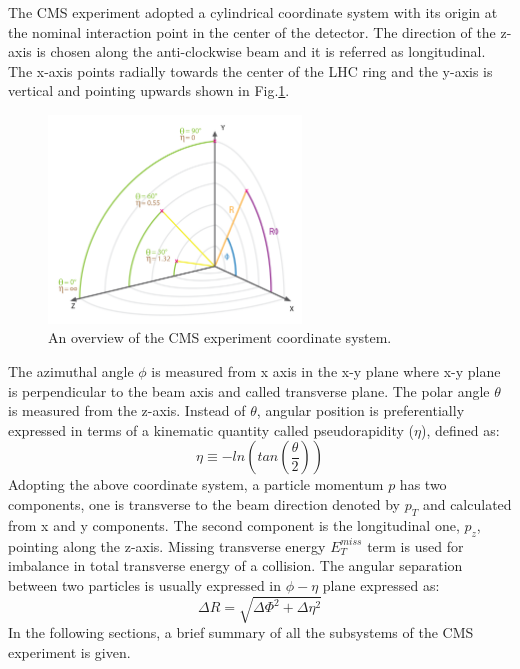The CMS experiment adopted a cylindrical coordinate system with its origin at the nominal interaction point in the center of the detector.    The direction of the z-axis is chosen along the anti-clockwise beam and it is referred as longitudinal. The x-axis points radially towards the center of the LHC ring and the y-axis is vertical and pointing upwards shown in Fig.\ref{fig:CMS_coordinates}. 
\begin{figure}[h!]
\centering
\includegraphics[width=0.6\textwidth]{fig/chapt3/img_cms_coordinates.png}
\caption{\label{fig:CMS_coordinates} An overview of the CMS experiment coordinate system.}
\end{figure}
The azimuthal angle $\phi$ is measured from x axis in the x-y plane where x-y plane is perpendicular to the beam axis and called transverse plane. The polar angle $\theta$ is measured from the z-axis. Instead of $\theta$, angular position is preferentially expressed in terms of a kinematic quantity called pseudorapidity ($\eta$), defined as:
\begin{equation}
\eta \equiv -ln(tan(\frac{\theta}{2}))
\end{equation}
Adopting the above coordinate system, a particle momentum $p$ has two components, one is transverse to the beam direction denoted by $p_{T}$ and calculated from x and y components. The second component is the longitudinal one, $p_{z}$, pointing along the z-axis. Missing transverse energy $E_{T}^{miss}$ term is used for imbalance in total transverse energy of a collision. The angular separation between two particles is usually expressed in $\phi-\eta$ plane expressed as:
\begin{equation}
\Delta R = \sqrt{\Delta\Phi^{2} + \Delta\eta^{2}}
\end{equation} 
In the following sections, a brief summary of all the subsystems of the CMS experiment is given.

